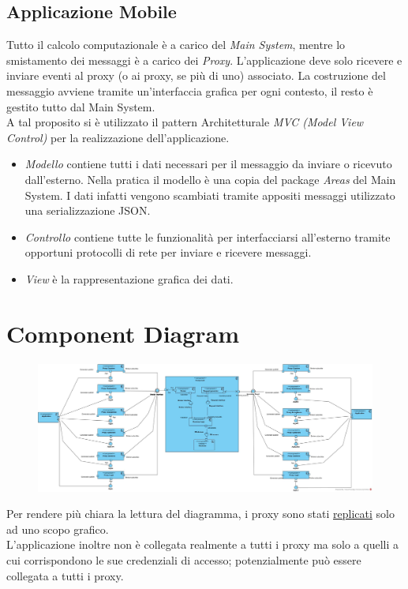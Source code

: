\subsection{Applicazione Mobile}
Tutto il calcolo computazionale è a carico del \textit{Main System}, mentre lo smistamento dei messaggi è a carico dei \textit{Proxy}. L'applicazione deve solo ricevere e inviare eventi al proxy (o ai proxy, se più di uno) associato. La costruzione del messaggio avviene tramite un'interfaccia grafica per ogni contesto, il resto è gestito tutto dal Main System.
\\A tal proposito si è utilizzato il pattern Architetturale \textit{MVC (Model View Control)} per la realizzazione dell'applicazione.
\begin{itemize}
	\item \textit{Modello} contiene tutti i dati necessari per il messaggio da inviare o ricevuto dall'esterno. Nella pratica il modello è una copia del package \textit{Areas} del Main System. I dati infatti vengono scambiati tramite appositi messaggi utilizzato una serializzazione JSON.
	\item \textit{Controllo} contiene tutte le funzionalità per interfacciarsi all'esterno tramite opportuni protocolli di rete per inviare e ricevere messaggi.
	\item \textit{View} è la rappresentazione grafica dei dati.
\end{itemize}

\section{Component Diagram}
\begin{figure}[H]
	\centering
	\includegraphics[width=1\textwidth]{Immagini/components.jpg}
\end{figure}
Per rendere più chiara la lettura del diagramma, i proxy sono stati \underline{replicati} solo ad uno scopo grafico. 
\\L'applicazione inoltre non è collegata realmente a tutti i proxy ma solo a quelli a cui corrispondono le sue credenziali di accesso; potenzialmente può essere collegata a tutti i proxy.

